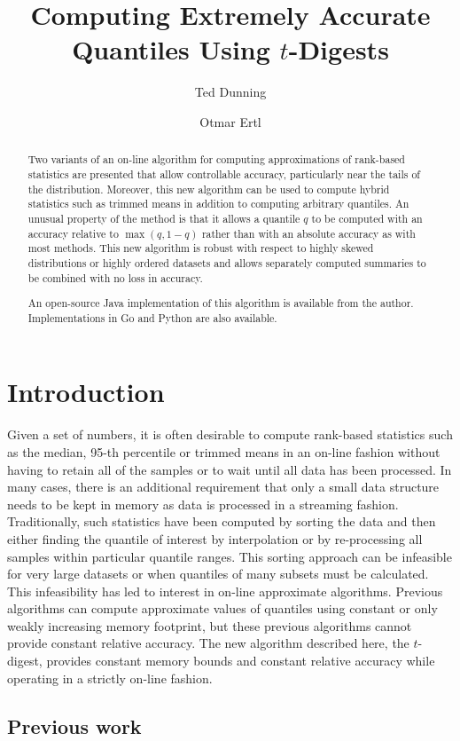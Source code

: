 \documentclass[11pt]{amsart}
\title{Computing Extremely Accurate Quantiles Using $t$-Digests}
\author{Ted Dunning}
\author{Otmar Ertl}
\date{}                                           %
\begin{document}
\begin{abstract}
Two variants of an on-line algorithm for computing approximations of rank-based statistics are presented that allow controllable accuracy, particularly near the tails of the distribution.  Moreover, this new algorithm can be used to compute hybrid statistics such as trimmed means in addition to computing arbitrary quantiles.  An unusual property of the method is that it allows a quantile $q$ to be computed with an accuracy relative to $\max(q, 1-q)$ rather than with an absolute accuracy as with most methods.  This new algorithm is robust with respect to highly skewed distributions or highly ordered datasets and allows separately computed summaries to be combined with no loss in accuracy.

An open-source Java implementation of this algorithm is available from the author. Implementations in Go and Python are also available.
\end{abstract}
\maketitle
\section{Introduction}
Given a set of numbers, it is often desirable to compute rank-based statistics such as the median, 95-th percentile or trimmed means in an on-line fashion without having to retain all of the samples or to wait until all data has been processed. In many cases, there is an additional requirement that only a small data structure needs to be kept in memory as data is processed in a streaming fashion.  Traditionally, such statistics have been computed by sorting the data and then either finding the quantile of interest by interpolation or by re-processing all samples within particular quantile ranges.  This sorting approach can be infeasible for very large datasets or when quantiles of many subsets must be calculated. This infeasibility has led to interest in on-line approximate algorithms. Previous algorithms can compute approximate values of quantiles using constant or only weakly increasing memory footprint, but these previous algorithms cannot provide constant relative accuracy.  The new algorithm described here, the $t$-digest, provides constant memory bounds and constant relative accuracy while operating in a strictly on-line fashion.

\subsection{Previous work}
\end{document}
